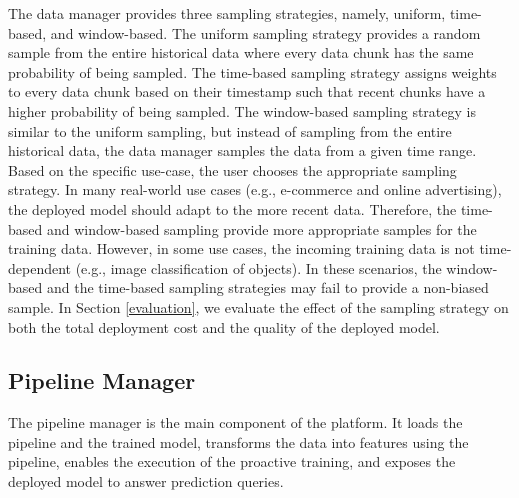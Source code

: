 The data manager provides three sampling strategies, namely, uniform, time-based, and window-based.
The uniform sampling strategy provides a random sample from the entire historical data where every data chunk has the same probability of being sampled.
The time-based sampling strategy assigns weights to every data chunk based on their timestamp such that recent chunks have a higher probability of being sampled.
The window-based sampling strategy is similar to the uniform sampling, but instead of sampling from the entire historical data, the data manager samples the data from a given time range. 
Based on the specific use-case, the user chooses the appropriate sampling strategy.
In many real-world use cases (e.g., e-commerce and online advertising), the deployed model should adapt to the more recent data.
Therefore, the time-based and window-based sampling provide more appropriate samples for the training data.
However, in some use cases, the incoming training data is not time-dependent (e.g., image classification of objects).
In these scenarios, the window-based and the time-based sampling strategies may fail to provide a non-biased sample.
In Section \ref{evaluation}, we evaluate the effect of the sampling strategy on both the total deployment cost and the quality of the deployed model.



\subsection{Pipeline Manager} \label{pipeline-manager} 
The pipeline manager is the main component of the platform.
It loads the pipeline and the trained model, transforms the data into features using the pipeline, enables the execution of the proactive training, and exposes the deployed model to answer prediction queries.

